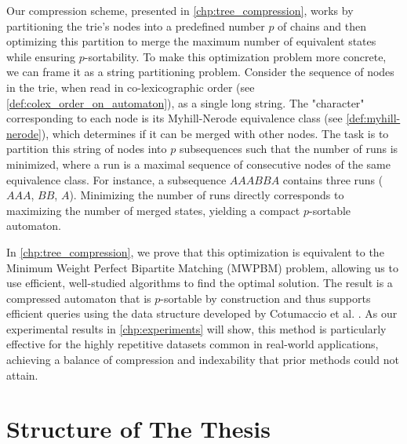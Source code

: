 Our compression scheme, presented in \cref{chp:tree_compression}, works by partitioning the trie's nodes into a predefined number $p$ of chains and then optimizing this partition to merge the maximum number of equivalent states while ensuring $p$-sortability. To make this optimization problem more concrete, we can frame it as a string partitioning problem. Consider the sequence of nodes in the trie, when read in co-lexicographic order (see \cref{def:colex_order_on_automaton}), as a single long string. The "character" corresponding to each node is its Myhill-Nerode equivalence class (see \cref{def:myhill-nerode}), which determines if it can be merged with other nodes. The task is to partition this string of nodes into $p$ subsequences such that the number of runs is minimized, where a run is a maximal sequence of consecutive nodes of the same equivalence class. For instance, a subsequence $AAABBA$ contains three runs ($AAA$, $BB$, $A$). Minimizing the number of runs directly corresponds to maximizing the number of merged states, yielding a compact $p$-sortable automaton.

In \cref{chp:tree_compression}, we prove that this optimization is equivalent to the Minimum Weight Perfect Bipartite Matching (MWPBM) problem, allowing us to use efficient, well-studied algorithms to find the optimal solution. The result is a compressed automaton that is $p$-sortable by construction and thus supports efficient queries using the data structure developed by Cotumaccio et al. \cite{cotumaccio2023co}. As our experimental results in \cref{chp:experiments} will show, this method is particularly effective for the highly repetitive datasets common in real-world applications, achieving a balance of compression and indexability that prior methods could not attain.

\section{Structure of The Thesis}
